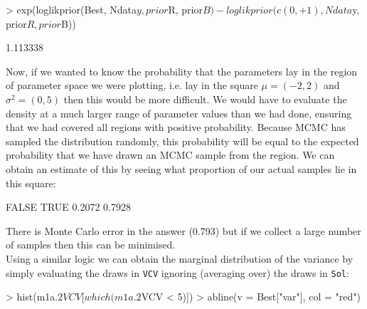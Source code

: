 \documentclass{article}
\begin{document}
\begin{Schunk}
\begin{Sinput}
> exp(loglikprior(Best, Ndata$y, prior$R, prior$B) - loglikprior(c(0, 
+     1), Ndata$y, prior$R, prior$B))
\end{Sinput}
\begin{Soutput}
[1] 1.113338
\end{Soutput}
\end{Schunk}


Now, if we wanted to know the probability that the parameters lay in the region of parameter space we were plotting, i.e. lay in the square $\mu = (-2,2)$ and $\sigma^{2} = (0,5)$ then this would be more difficult. We would have to evaluate the density at a much larger range of parameter values than we had done, ensuring that we had covered all regions with positive probability. Because MCMC has sampled the distribution randomly, this probability will be equal to the expected probability that we have drawn an MCMC sample from the region. We can obtain an estimate of this by seeing what proportion of our actual samples lie in this square:

\begin{Schunk}
\begin{Soutput}
 FALSE   TRUE 
0.2072 0.7928 
\end{Soutput}
\end{Schunk}

There is Monte Carlo error in the answer (0.793) but if we collect a large number of samples then this can be minimised.\\ 

Using a similar logic we can obtain the marginal distribution of the variance by simply evaluating the draws in \texttt{VCV} ignoring (averaging over) the draws in \texttt{Sol}:

\iftalk
\else
\begin{Schunk}
\begin{Sinput}
> hist(m1a.2$VCV[which(m1a.2$VCV < 5)])
> abline(v = Best["var"], col = "red")
\end{Sinput}
\end{Schunk}
\fi
\end{document}
